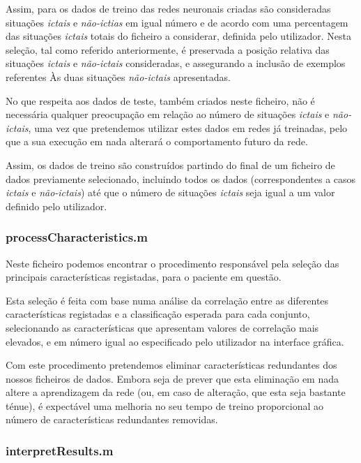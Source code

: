 \documentclass{article}
\begin{document}
Assim, para os dados de treino das redes neuronais criadas são consideradas situações \emph{ictais} e \emph{não-ictias} em igual número e de acordo com uma percentagem das situações \emph{ictais} totais do ficheiro a considerar, definida pelo utilizador. Nesta seleção, tal como referido anteriormente, é preservada a posição relativa das situações \emph{ictais} e \emph{não-ictais} consideradas, e assegurando a inclusão de exemplos referentes Às duas situações \emph{não-ictais} apresentadas.

No que respeita aos dados de teste, também criados neste ficheiro, não é necessária qualquer preocupação em relação ao número de situações \emph{ictais} e \emph{não-ictais}, uma vez que pretendemos utilizar estes dados em redes já treinadas, pelo que a sua execução em nada alterará o comportamento futuro da rede.

Assim, os dados de treino são construídos partindo do final de um ficheiro de dados previamente selecionado, incluindo todos os dados (correspondentes a casos \emph{ictais} e \emph{não-ictais}) até que o número de situações \emph{ictais} seja igual a um valor definido pelo utilizador.

\subsubsection{processCharacteristics.m}

Neste ficheiro podemos encontrar o procedimento responsável pela seleção das principais características registadas, para o paciente em questão.

Esta seleção é feita com base numa análise da correlação entre as diferentes características registadas e a classificação esperada para cada conjunto, selecionando as características que apresentam valores de correlação mais elevados, e em número igual ao especificado pelo utilizador na interface gráfica.

Com este procedimento pretendemos eliminar características redundantes dos nossos ficheiros de dados. Embora seja de prever que esta eliminação em nada altere a aprendizagem da rede (ou, em caso de alteração, que esta seja bastante ténue), é expectável uma melhoria no seu tempo de treino proporcional ao número de características redundantes removidas.

\subsubsection{interpretResults.m}
\end{document}
